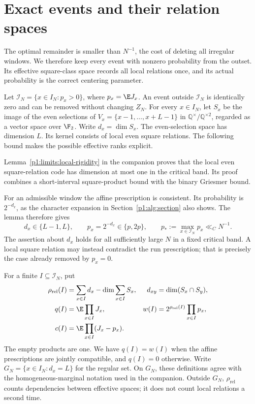 \section{Exact events and their relation spaces}
\label{p13:exact:section}

The optimal remainder is smaller than \(N^{-1}\), the cost of deleting
all irregular windows. We therefore keep every event with nonzero
probability from the outset. Its effective square-class space records
all local relations once, and its actual probability is the correct
centering parameter.

Let \(\mathcal I_N=\{x\in I_N:p_x>0\}\), where \(p_x=\E J_x\).
An event outside \(\mathcal I_N\) is identically zero and can be
removed without changing \(Z_N\). For every \(x\in I_N\), let
\(S_x\) be the image of the even selections of
\(V_x=\{x-1,\ldots,x+L-1\}\) in
\(\mathbb Q^\times/\mathbb Q^{\times2}\), regarded as a vector
space over \(\F_2\). Write \(d_x=\dim S_x\).
The even-selection space has dimension $L$. Its kernel consists of
local even square relations. The following bound makes the possible
effective ranks explicit.

Lemma~\ref{p1:limits:local-rigidity} in the companion proves that
the local even square-relation code has dimension at most one in the
critical band. Its proof combines a short-interval square-product bound
with the binary Griesmer bound.

For an admissible window the affine prescription is consistent. Its
probability is $2^{-d_x}$, as the character expansion in
Section~\ref{p1:alg:section} also shows. The lemma therefore gives
\begin{equation}
 d_x\in\{L-1,L\},\qquad p_x=2^{-d_x}\in\{p,2p\},
 \qquad p_*:=\max_{x\in\mathcal I_N}p_x\ll_C N^{-1}.
 \label{p13:exact:marginals}
\end{equation}
The assertion about \(d_x\) holds for all sufficiently large \(N\)
in a fixed critical band. A local square relation may instead
contradict the run prescription; that is precisely the case
already removed by \(p_x=0\).

For a finite \(I\subseteq\mathcal I_N\), put
\begin{align}
 \rho_{\mathrm{rel}}(I)
  &=\sum_{x\in I}d_x-\dim\sum_{x\in I}S_x,
       & d_{xy}&=\dim(S_x\cap S_y),\label{p13:exact:rank}\\
 q(I)&=\E\prod_{x\in I}J_x,
       & w(I)&=2^{\rho_{\mathrm{rel}}(I)}
                         \prod_{x\in I}p_x,\label{p13:exact:weights}\\
 c(I)&=\E\prod_{x\in I}(J_x-p_x).
 \label{p13:exact:center}
\end{align}
The empty products are one. We have \(q(I)=w(I)\) when the
affine prescriptions are jointly compatible, and \(q(I)=0\)
otherwise. Write $G_N=\{x\in I_N:d_x=L\}$ for the regular set.
On $G_N$, these definitions agree
with the homogeneous-marginal notation used in the companion.
Outside \(G_N\), \(\rho_{\mathrm{rel}}\) counts dependencies
between effective spaces; it does not count local relations a
second time.

